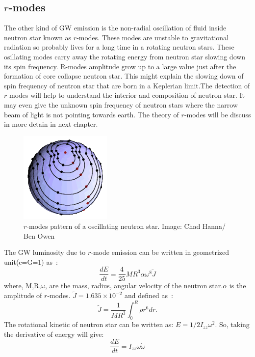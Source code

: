 \documentclass{ttuthes2007}
\begin{document}
\subsection{$r$-modes}
The other kind of \ac{GW} emission is the non-radial oscillation of fluid
inside neutron star known as $r$-modes. These modes are unstable to
gravitational radiation so probably lives for a long time in a rotating neutron
stars. These osillating modes carry away the rotating energy from neutron star
slowing down its spin frequency. R-modes amplitude grow up to a large value just
after the formation of core collapse neutron star. This might explain the
slowing down of spin frequency of neutron star that are born in a Keplerian
limit.The detection of $r$-modes will help to
understand the interior and composition of neutron star. It may even give the
unknown spin frequency of neutron stars where the narrow beam of light is not
pointing towards earth. The theory of $r$-modes will be discuss in more detain in next chapter.
\begin{figure}
\centering
	\includegraphics[width=0.4\textwidth]{figure/333.png}
	\caption{$r$-modes pattern of a oscillating neutron star. Image: Chad
Hanna/ Ben Owen}
\end{figure}
The \ac{GW} luminosity due to $r$-mode emission can be written in geometrized
unit(c=G=1) as~\cite{Owen:2010ng}:
\begin{equation}\label{eq:modeenergy}
\frac{dE}{dt}=\frac{4}{25}M R^3 \alpha \omega^8\tilde{J}
\end{equation}
where, M,R,$\omega$, are the mass, radius, angular velocity of the neutron
star.$\alpha$ is the amplitude of $r$-modes. $\tilde{J}=1.635\times10^{-2}$ and
defined as~\cite{Owen:1998xg}:
\begin{equation}
\tilde{J}=\frac{1}{MR^3}\int_0^R\rho r^6dr.
\end{equation}
The rotational kinetic of neutron star can be written as:
$E=1/2I_{zz}\omega^2$. So, taking the derivative of energy will give:
\begin{equation}\label{eq:rotenergy}
\frac{dE}{dt}= I_{zz}\omega\dot{\omega}
\end{equation}
\end{document}
